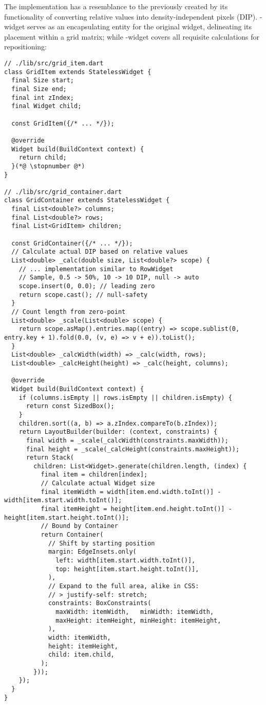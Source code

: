 \noindent The implementation has a resemblance to the previously created  by its functionality of 
converting relative values into density-independent pixels (DIP). -widget serves as an encapsulating 
entity for the original widget, delineating its placement within a grid matrix; while -widget covers
all requisite calculations for repositioning:

\begin{lstlisting}
// ./lib/src/grid_item.dart
class GridItem extends StatelessWidget {
  final Size start;
  final Size end;
  final int zIndex;
  final Widget child;

  const GridItem({/* ... */});

  @override
  Widget build(BuildContext context) {
    return child;
  }(*@ \stopnumber @*)
}

// ./lib/src/grid_container.dart
class GridContainer extends StatelessWidget {
  final List<double?> columns;
  final List<double?> rows;
  final List<GridItem> children;

  const GridContainer({/* ... */});
  // Calculate actual DIP based on relative values
  List<double> _calc(double size, List<double?> scope) {
    // ... implementation similar to RowWidget
    // Sample, 0.5 -> 50%, 10 -> 10 DIP, null -> auto
    scope.insert(0, 0.0); // leading zero
    return scope.cast(); // null-safety
  }
  // Count length from zero-point
  List<double> _scale(List<double> scope) {
    return scope.asMap().entries.map((entry) => scope.sublist(0, entry.key + 1).fold(0.0, (v, e) => v + e)).toList();
  }
  List<double> _calcWidth(width) => _calc(width, rows);
  List<double> _calcHeight(height) => _calc(height, columns);

  @override
  Widget build(BuildContext context) {
    if (columns.isEmpty || rows.isEmpty || children.isEmpty) {
      return const SizedBox();
    }
    children.sort((a, b) => a.zIndex.compareTo(b.zIndex));
    return LayoutBuilder(builder: (context, constraints) {
      final width = _scale(_calcWidth(constraints.maxWidth));
      final height = _scale(_calcHeight(constraints.maxHeight));
      return Stack(
        children: List<Widget>.generate(children.length, (index) {
          final item = children[index];
          // Calculate actual Widget size
          final itemWidth = width[item.end.width.toInt()] - width[item.start.width.toInt()];
          final itemHeight = height[item.end.height.toInt()] - height[item.start.height.toInt()];
          // Bound by Container
          return Container(
            // Shift by starting position
            margin: EdgeInsets.only(
              left: width[item.start.width.toInt()],
              top: height[item.start.height.toInt()],
            ),
            // Expand to the full area, alike in CSS:
            // > justify-self: stretch;
            constraints: BoxConstraints(
              maxWidth: itemWidth,   minWidth: itemWidth,
              maxHeight: itemHeight, minHeight: itemHeight,
            ),
            width: itemWidth,
            height: itemHeight,
            child: item.child,
          );
        }));
    });
  }
}
\end{lstlisting}

